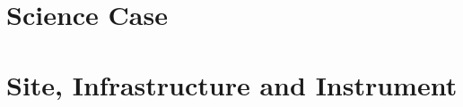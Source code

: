 \documentclass[url,11pt,fleqn]{book} %
\begin{document}

\part{Science Case}
\part{Site, Infrastructure and Instrument}
\label{part:Instrumental}





\appendix





\clearpage %
{}


%

\clearpage
\listoffigures
\clearpage
\listoftables
\clearpage
{}
\newpage

\printnomenclature[0.75in] 
\newpage

\newpage 
%
\FloatBarrier
\end{document}
